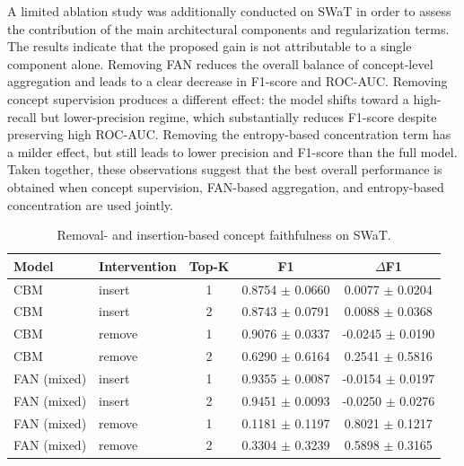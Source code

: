 \documentclass[runningheads]{llncs}
\begin{document}
A limited ablation study was additionally conducted on SWaT in order to assess the contribution of the main architectural components and regularization terms. The results indicate that the proposed gain is not attributable to a single component alone. Removing FAN reduces the overall balance of concept-level aggregation and leads to a clear decrease in F1-score and ROC-AUC. Removing concept supervision produces a different effect: the model shifts toward a high-recall but lower-precision regime, which substantially reduces F1-score despite preserving high ROC-AUC. Removing the entropy-based concentration term has a milder effect, but still leads to lower precision and F1-score than the full model. Taken together, these observations suggest that the best overall performance is obtained when concept supervision, FAN-based aggregation, and entropy-based concentration are used jointly.

\begin{table}[tbp]
\caption{Removal- and insertion-based concept faithfulness on SWaT.}
\label{tab:faithfulness_swat}
\centering
\begin{tabular}{llccc}
\toprule
Model & Intervention & Top-K & F1 & $\Delta$F1 \\
\midrule
CBM & insert & 1 & 0.8754 $\pm$ 0.0660 & 0.0077 $\pm$ 0.0204 \\
CBM & insert & 2 & 0.8743 $\pm$ 0.0791 & 0.0088 $\pm$ 0.0368 \\
CBM & remove & 1 & 0.9076 $\pm$ 0.0337 & -0.0245 $\pm$ 0.0190 \\
CBM & remove & 2 & 0.6290 $\pm$ 0.6164 & 0.2541 $\pm$ 0.5816 \\
FAN (mixed) & insert & 1 & 0.9355 $\pm$ 0.0087 & -0.0154 $\pm$ 0.0197 \\
FAN (mixed) & insert & 2 & 0.9451 $\pm$ 0.0093 & -0.0250 $\pm$ 0.0276 \\
FAN (mixed) & remove & 1 & 0.1181 $\pm$ 0.1197 & 0.8021 $\pm$ 0.1217 \\
FAN (mixed) & remove & 2 & 0.3304 $\pm$ 0.3239 & 0.5898 $\pm$ 0.3165 \\
\bottomrule
\end{tabular}
\end{table}
\end{document}

